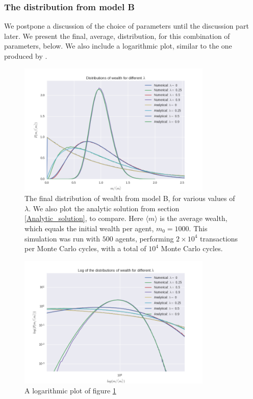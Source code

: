 \documentclass[a4paper, 10pt]{article}
\begin{document}
\subsubsection{The distribution from model B}
We postpone a discussion of the choice of parameters until the discussion part later. We present the final, average, distribution, for this combination of parameters, below. We also include a logarithmic plot, similar to the one produced by \cite{Gibbs}.
\begin{figure}[!ht]
\centering
\includegraphics[height=2.5in]{distDiffLamb.png} %
\caption{The final distribution of wealth from model B, for various values of $\lambda$. We also plot the analytic solution from section \ref{Analytic_solution}, to compare. Here $\langle m \rangle$ is the average wealth, which equals the initial wealth per agent, $m_0=1000$. This simulation was run with $500$ agents, performing $2\times 10^4$ transactions per Monte Carlo cycles, with a total of $10^4$ Monte Carlo cycles.}\label{fig:ModelB_final_distribution}
\end{figure}
\begin{figure}[!ht]
\centering
\includegraphics[height=2.5in]{logDistDiffLamb.png} %
\caption{A logarithmic plot of figure \ref{fig:ModelB_final_distribution}}\label{fig:ModelB_final_distribution_log}
\end{figure}
\pagebreak
\end{document}
